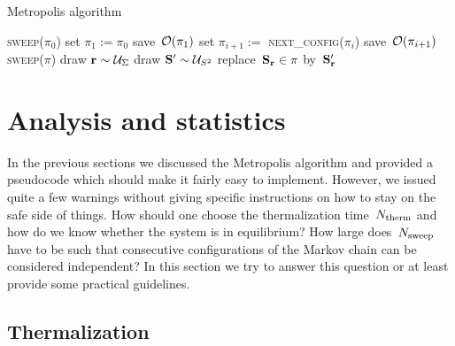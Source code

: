 \begin{algorithm}
  \caption{Metropolis algorithm}\label{alg:metropolis}
  \begin{algorithmic}[1]
    \Statex
     
       
        \State \textsc{sweep}($\pi_0$)
      \EndFor
      \State set $\pi_1 := \pi_0$
      \State save~$\mathcal{O}(\pi_1)$
        \State set $\pi_{i+1} :=$ \textsc{next\_config}($\pi_i$)
        \State save~$\mathcal{O}(\pi_{i+1})$
      \EndFor
    \EndProcedure
    \Statex
        \State \textsc{sweep}($\pi$)
      \EndFor
      \State \Return{$\pi$}
    \EndFunction
    \Statex
     
        \State draw $\mathbf{r} \sim \mathcal{U}_{\Sigma}$
        \State draw $\mathbf{S}' \sim \mathcal{U}_{S^2}$
            \State replace~$\mathbf{S}_{\mathbf{r}} \in \pi$ by~$\mathbf{S}'_{\mathbf{r}}$
        \EndIf
      \EndFor
    \EndProcedure
  \end{algorithmic}
\end{algorithm}

%
\section{Analysis and statistics}\label{sec:analysis}
%
In the previous sections we discussed the Metropolis algorithm and provided a
pseudocode which should make it fairly easy to implement. However, we issued
quite a few warnings without giving specific instructions on how to stay on the
safe side of things. How should one choose the thermalization time~$N_{\mathrm{therm}}$ and
how do we know whether the system is in equilibrium? How large does~$N_{\mathrm{sweep}}$
have to be such that consecutive configurations of the Markov chain can be
considered independent? In this section we try to answer this question or at
least provide some practical guidelines.

\subsection{Thermalization}

